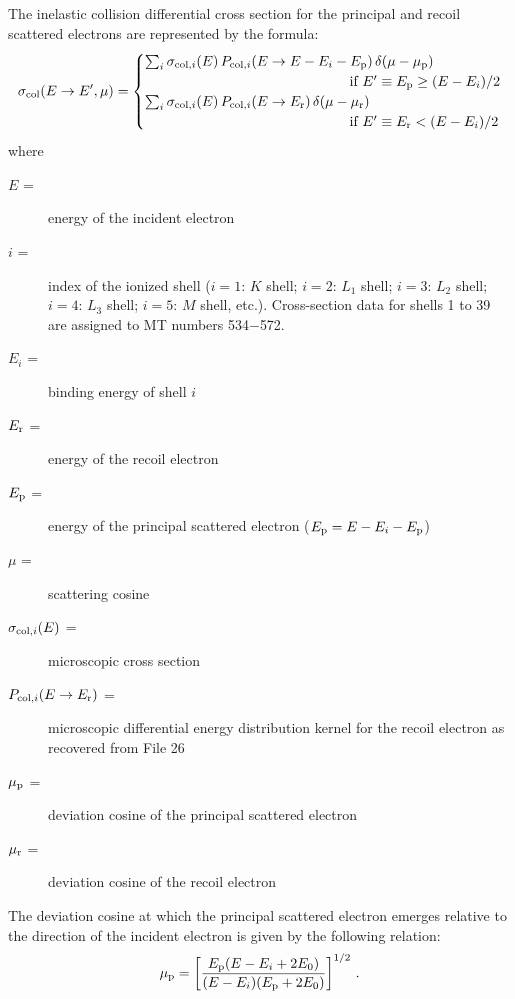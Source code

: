 The inelastic collision differential cross section for the principal and
recoil scattered electrons are represented by the formula:
  \begin{equation}
    \sigma_{\rm col}(E\rightarrow E',\mu)=\begin{cases}
    \sum_i\sigma_{{\rm col},i}(E) \,
    P_{{\rm col},i}(E\rightarrow E-E_i-E_{\rm p})\,
    \delta(\mu-\mu_{\rm p}) & \\ & \hspace{-7em}
    \text{if $E' \equiv E_{\rm p} \ge (E-E_i)/2$} \\
    \sum_i\sigma_{{\rm col},i}(E) \,
    P_{{\rm col},i}(E\rightarrow E_{\rm r}) \,
    \delta(\mu-\mu_{\rm r}) & \\ & \hspace{-7em}
    \text{if $E' \equiv E_{\rm r} < (E-E_i)/2$} \\
    \end{cases}
  \label{elr_eq5}
  \end{equation}
\noindent where
\begin{description}
\item [$E$ =] energy of the incident electron
\item [$i$ =] index of the ionized shell ($i=1$: $K$ shell; $i=2$: $L_1$
shell; $i=3$: $L_2$ shell; $i=4$: $L_3$ shell; $i=5$: $M$ shell, etc.).
Cross-section data for shells 1 to 39 are assigned to MT numbers 534$-$572.
\item [$E_i$ =] binding energy of shell $i$
\item [$E_{\rm r}$ =] energy of the recoil electron
\item [$E_{\rm p}$ =] energy of the principal scattered electron
($E_{\rm p}=E-E_i-E_{\rm p}$)
\item [$\mu$ =] scattering cosine
\item [$\sigma_{{\rm col},i}(E)$ =] microscopic cross section
\item [$P_{{\rm col},i}(E\rightarrow E_{\rm r})$ =] microscopic differential
energy distribution kernel for the recoil electron as recovered from File 26
\item [$\mu_{\rm p}$ =] deviation cosine of the principal scattered electron
\item [$\mu_{\rm r}$ =] deviation cosine of the recoil electron
\end{description}

\noindent The deviation cosine at which the principal scattered electron
emerges relative to the direction of the incident electron is given by the
following relation:
  \begin{equation}
    \mu_{\rm p} = \left[{E_{\rm p}(E-E_i+2E_0)\over (E-E_i)(E_{\rm p}+2E_0)}
    \right]^{1/2} \, .
  \label{elr_eq6}
  \end{equation}

